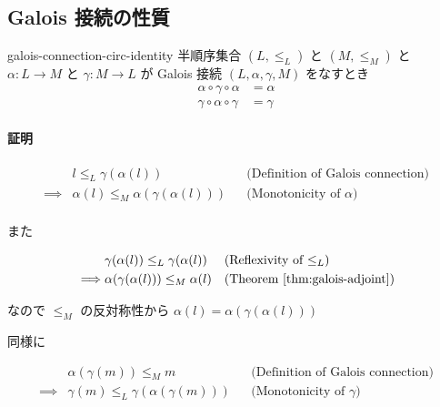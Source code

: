 \documentclass[uplatex]{jsarticle}
\begin{document}
\subsection{Galois 接続の性質}

\begin{boxtheorem}{}{galois-connection-circ-identity}
  半順序集合 $(L, \leq_L)$ と $(M, \leq_M)$ と
  $\alpha: L \to M$ と $\gamma: M \to L$ が Galois 接続 $(L, \alpha, \gamma, M)$ をなすとき
  \begin{align*}
    \alpha \circ \gamma \circ \alpha & = \alpha \\
    \gamma \circ \alpha \circ \gamma & = \gamma
  \end{align*}
\end{boxtheorem}

\paragraph*{証明}

\begin{align*}
           & l \leq_L \gamma(\alpha(l))
           &                                            & \text{(Definition of Galois connection)} \\
  \implies & \alpha(l) \leq_M \alpha(\gamma(\alpha(l)))
           &                                            & \text{(Monotonicity of $\alpha$)}        \\
\end{align*}

また

\begin{align*}
           & \gamma(\alpha(l)) \leq_L \gamma(\alpha(l))
           &                                            & \text{(Reflexivity of $\leq_L$)}          \\
  \implies & \alpha(\gamma(\alpha(l))) \leq_M \alpha(l)
           &                                            & \text{(Theorem \ref{thm:galois-adjoint})} \\
\end{align*}

なので $\leq_M$ の反対称性から $\alpha(l) = \alpha(\gamma(\alpha(l)))$

同様に

\begin{align*}
           & \alpha(\gamma(m)) \leq_M m
           &                                            & \text{(Definition of Galois connection)} \\
  \implies & \gamma(m) \leq_L \gamma(\alpha(\gamma(m)))
           &                                            & \text{(Monotonicity of $\gamma$)}        \\
\end{align*}
\end{document}
